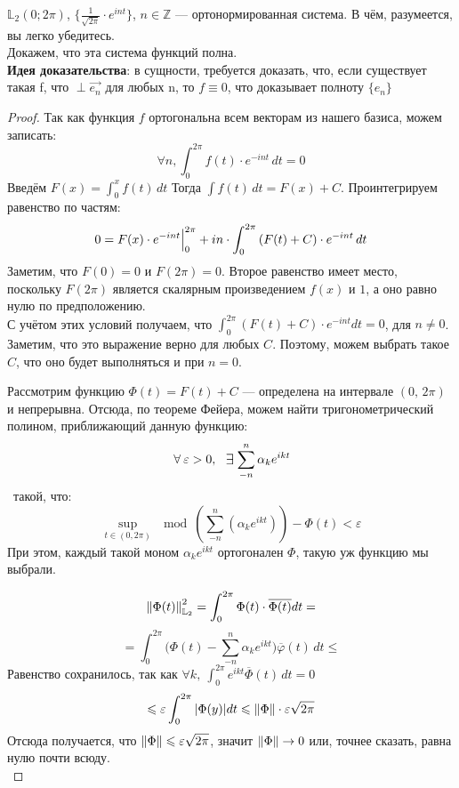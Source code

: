 \documentclass[12pt]{article}
\begin{document}
	\example $\mathbb{L}_2 (0; 2\pi)$, $\{ \frac{1}{\sqrt{2\pi}} \cdot e^{int} \}$, $n \in \mathbb{Z}$ --- ортонормированная система.
	{\color{gray} В чём, разумеется, вы легко убедитесь.}\\
	Докажем, что эта система функций полна.\\
	\textbf{Идея доказательства}: в сущности, требуется доказать, что, если существует такая f, что $\perp \vec{e_n}$
	для любых n, то $f \equiv 0$, что доказывает полноту $\{ e_n \}$
	\begin{proof}
		Так как функция $f$ ортогональна всем векторам из нашего базиса, можем записать:
		$$ \forall n, \int_0^{2\pi} f(t) \cdot e^{-int} \,dt = 0 $$
		Введём $F(x) = \int_0^x f(t) \,dt$ Тогда $\int f(t) \,dt = F(x) + C$. Проинтегрируем равенство по частям:
		$$ 0 = F(x) \cdot e^{-int} \Big|_{0}^{2\pi} 
		   + i n \cdot \int_0^{2\pi} \left(F(t) + C\right) \cdot e^{-int} \,dt $$
		Заметим, что $F(0) = 0$ и $F(2\pi) = 0$. Второе равенство имеет место, поскольку $F(2\pi)$ является 
        скалярным произведением $f(x)$ и $1$, а оно равно нулю по предположению. \\
		С учётом этих условий получаем, что $\int_0^{2\pi} (F(t) + C) \cdot e^{-int} dt = 0$, для $n \neq 0$. 
		Заметим, что это выражение верно для любых $C$. Поэтому, можем выбрать такое $C$, что оно будет
		выполняться и при $n = 0$.
		
		Рассмотрим функцию $\Phi(t) = F(t) + C$ --- определена на интервале $(0,\, 2\pi)$ и непрерывна.
		Отсюда, по теореме Фейера, можем найти тригонометрический полином, приближающий данную функцию:
		$$\forall \varepsilon > 0,\, \:\Exists\! \sum_{-n}^n \alpha_k e^{ikt}$$\
		такой, что:
		$$ \underset{t \in (0,2\pi)}{\sup} \mod{(\sum_{-n}^n (\alpha_k e^{ikt})) - \Phi(t)} < \varepsilon $$
		При этом, каждый такой моном $\alpha_k e^{ikt}$ ортогонален $\Phi$, такую уж функцию мы выбрали.
		
		$$ \left\| \Phi(t) \right\|^2_{\mathbb{L}_2} = \int_0^{2\pi} \Phi(t) \cdot \overline{\Phi(t)} dt = $$
		$$ = \int_0^{2\pi}\Big(\Phi(t) - \sum_{-n}^n \alpha_k e^{ikt}\Big)\overline{\varphi}(t) \,dt \leq $$
		Равенство сохранилось, так как $\forall k,\: \int_0^{2\pi}e^{ikt}\overline{\Phi}(t) \,dt = 0$
		$$ \leqslant \varepsilon \int_0^{2\pi} | \Phi(y) | dt \leqslant \left\| \Phi \right\| \cdot \varepsilon\sqrt{2\pi} $$
		Отсюда получается, что $\left\| \Phi \right\| \leqslant \varepsilon \sqrt{2\pi}$, значит $\left\| \Phi \right\| \rightarrow 0$ или, точнее сказать,
		равна нулю почти всюду.\\
	\end{proof}
	
\end{document}
